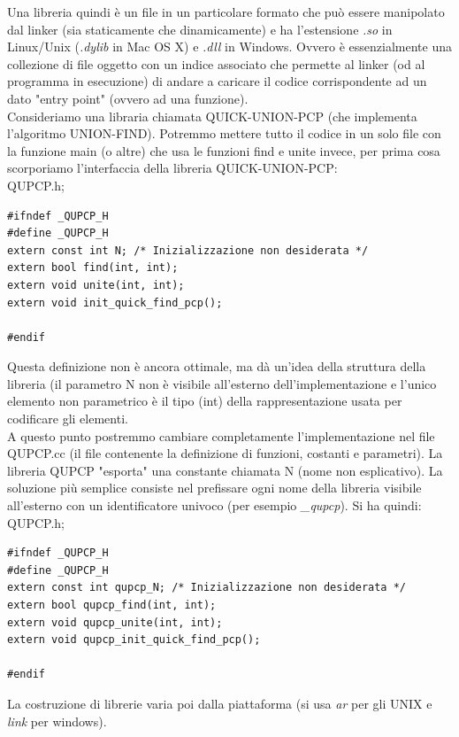 \documentclass[a4paper,12pt, oneside]{book}
\begin{document}
	Una libreria quindi è un file in un particolare formato che può essere manipolato dal
	linker (sia staticamente che dinamicamente) e ha l'estensione \textit{.so} in Linux/Unix (\textit{.dylib} in Mac OS X) e \textit{.dll} in Windows. Ovvero è essenzialmente una collezione di file oggetto con
	un indice associato che permette al linker (od al programma in esecuzione) di andare a caricare il codice corrispondente ad un dato "entry point" (ovvero ad una funzione).\\
	Consideriamo una libraria chiamata QUICK-UNION-PCP (che
	implementa l'algoritmo UNION-FIND). Potremmo mettere tutto il codice in un solo file con la funzione main (o
	altre) che usa le funzioni find e unite invece, per prima cosa scorporiamo l'interfaccia della libreria
	QUICK-UNION-PCP:\\
	QUPCP.h;
	\begin{verbatim}
#ifndef _QUPCP_H
#define _QUPCP_H
extern const int N; /* Inizializzazione non desiderata */
extern bool find(int, int);
extern void unite(int, int);
extern void init_quick_find_pcp();

#endif
\end{verbatim}
	Questa definizione non è ancora ottimale, ma dà un'idea della
	struttura della libreria (il parametro N non è visibile all'esterno dell'implementazione e l'unico elemento non parametrico è il tipo (int) della
	rappresentazione usata per codificare gli elementi.\\
	A questo punto postremmo cambiare completamente
	l'implementazione nel file QUPCP.cc (il file contenente la
	definizione di funzioni, costanti e parametri). La libreria QUPCP "esporta" una constante chiamata N (nome non esplicativo). La soluzione più semplice consiste nel prefissare ogni nome
	della libreria visibile all'esterno con un identificatore univoco (per esempio \textit{\_qupcp}). Si ha quindi:
	QUPCP.h;
	\begin{verbatim}
#ifndef _QUPCP_H
#define _QUPCP_H
extern const int qupcp_N; /* Inizializzazione non desiderata */
extern bool qupcp_find(int, int);
extern void qupcp_unite(int, int);
extern void qupcp_init_quick_find_pcp();

#endif
\end{verbatim}
	La costruzione di librerie varia poi dalla piattaforma (si usa \textit{ar} per gli UNIX e \textit{link} per windows).
\end{document}
